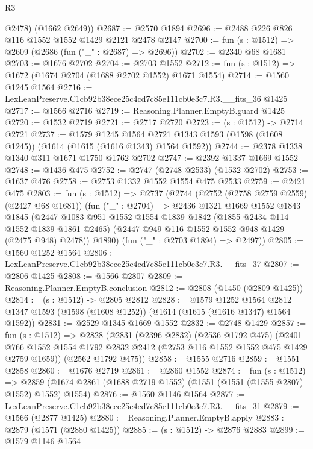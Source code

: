 \begin{lexlean}{R3}
\begin{coremodule}
        @2478)
      (@1662 @2649))
@2687 := @2570 @1894
@2696 := @2488 @226 @826 @116 @1552 @1552 @1429 @2121 @2478 @2147
@2700 := fun (s : @1512) => @2609 (@2686 (fun ("_" : @2687) => @2696))
@2702 := @2340 @68 @1681
@2703 := @1676 @2702
@2704 := @2703 @1552
@2712 := fun (s : @1512) => @1672 (@1674 @2704 (@1688 @2702 @1552) @1671 @1554)
@2714 := @1560 @1245 @1564
@2716 := LexLeanPreserve.C1cb92b38ece25c4cd7c85e111cb0e3c7.R3.__fits_36 @1425
@2717 := @1566 @2716
@2719 := Reasoning.Planner.EmptyB.guard @1425
@2720 := @1532 @2719
@2721 := @2717 @2720
@2723 := (s : @1512) -> @2714 @2721
@2737 := @1579
    @1245
    @1564
    @2721
    @1343
    @1593
    (@1598 (@1608 @1245))
    (@1614 (@1615 (@1616 @1343) @1564 @1592))
@2744 := @2378 @1338 @1340 @311 @1671 @1750 @1762 @2702
@2747 := @2392 @1337 @1669 @1552
@2748 := @1436 @475
@2752 := @2747 (@2748 @2533) (@1532 @2702)
@2753 := @1637 @476
@2758 := @2753 @1332 @1552 @1554 @475 @2533
@2759 := @2421 @475
@2803 := fun (s : @1512) =>
  @2737
    (@2744
      (@2752 (@2758 @2759 @2559) (@2427 @68 @1681))
      (fun ("_" : @2704) =>
      @2436
        @1321
        @1669
        @1552
        @1843
        @1845
        (@2447
          @1083
          @951
          @1552
          @1554
          @1839
          @1842
          (@1855 @2434 @114 @1552 @1839 @1861 @2465)
          (@2447 @949 @116 @1552 @1552 @948 @1429 (@2475 @948) @2478))
        @1890)
      (fun ("_" : @2703 @1894) => @2497))
@2805 := @1560 @1252 @1564
@2806 := LexLeanPreserve.C1cb92b38ece25c4cd7c85e111cb0e3c7.R3.__fits_37
@2807 := @2806 @1425
@2808 := @1566 @2807
@2809 := Reasoning.Planner.EmptyB.conclusion
@2812 := @2808 (@1450 (@2809 @1425))
@2814 := (s : @1512) -> @2805 @2812
@2828 := @1579
    @1252
    @1564
    @2812
    @1347
    @1593
    (@1598 (@1608 @1252))
    (@1614 (@1615 (@1616 @1347) @1564 @1592))
@2831 := @2529 @1345 @1669 @1552
@2832 := @2748 @1429
@2857 := fun (s : @1512) =>
  @2828
    (@2831
      (@2396 @2832)
      (@2536 @1792 @475)
      (@2401 @766 @1552 @1554 @1792 @2832 @2412 (@2753 @116 @1552 @1552 @475 @1429 @2759 @1659))
      (@2562 @1792 @475))
@2858 := @1555 @2716
@2859 := @1551 @2858
@2860 := @1676 @2719
@2861 := @2860 @1552
@2874 := fun (s : @1512) =>
  @2859 (@1674 @2861 (@1688 @2719 @1552) (@1551 (@1551 (@1555 @2807) @1552) @1552) @1554)
@2876 := @1560 @1146 @1564
@2877 := LexLeanPreserve.C1cb92b38ece25c4cd7c85e111cb0e3c7.R3.__fits_31
@2879 := @1566 (@2877 @1425)
@2880 := Reasoning.Planner.EmptyB.apply
@2883 := @2879 (@1571 (@2880 @1425))
@2885 := (s : @1512) -> @2876 @2883
@2899 := @1579
    @1146
    @1564

\end{coremodule}
\end{lexlean}
